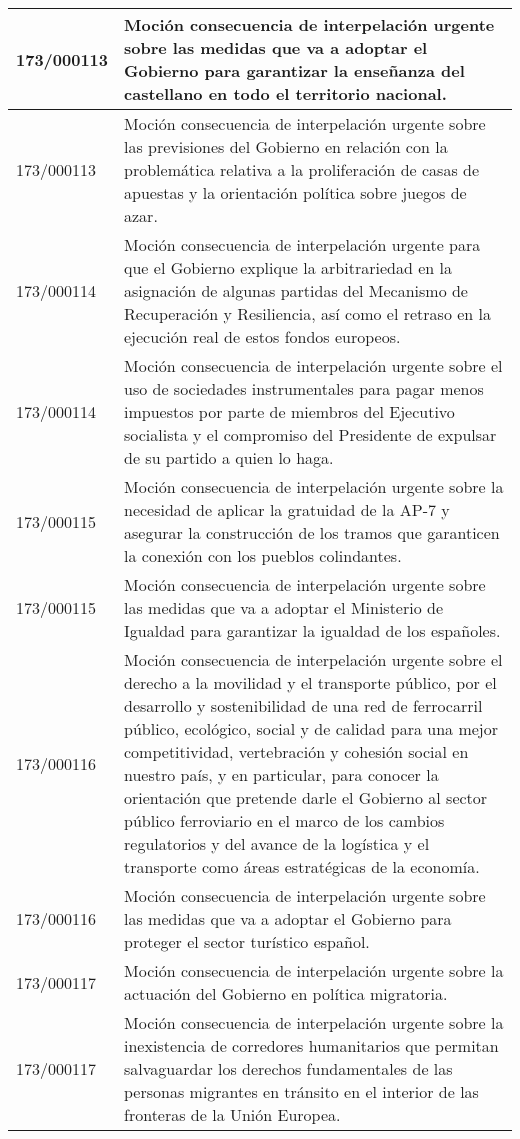 {\begin{table}[H]
\begin{center}
\begin{tabularx}{\linewidth}{| l | X |}
\hline
173/000113 & Moción consecuencia de interpelación urgente sobre las medidas que va a adoptar el Gobierno para garantizar la enseñanza del castellano en todo el territorio nacional. \\
\hline
173/000113 & Moción consecuencia de interpelación urgente sobre las previsiones del Gobierno en relación con la problemática relativa a la proliferación de casas de apuestas y la orientación política sobre juegos de azar. \\
\hline
173/000114 & Moción consecuencia de interpelación urgente para que el Gobierno explique la arbitrariedad en la asignación de algunas partidas del Mecanismo de Recuperación y Resiliencia, así como el retraso en la ejecución real de estos fondos europeos. \\
\hline
173/000114 & Moción consecuencia de interpelación urgente sobre el uso de sociedades instrumentales para pagar menos impuestos por parte de miembros del Ejecutivo socialista y el compromiso del Presidente de expulsar de su partido a quien lo haga. \\
\hline
173/000115 & Moción consecuencia de interpelación urgente sobre la necesidad de aplicar la gratuidad de la AP-7 y asegurar la construcción de los tramos que garanticen la conexión con los pueblos colindantes. \\
\hline
173/000115 & Moción consecuencia de interpelación urgente sobre las medidas que va a adoptar el Ministerio de Igualdad para garantizar la igualdad de los españoles. \\
\hline
173/000116 & Moción consecuencia de interpelación urgente sobre el derecho a la movilidad y el transporte público, por el desarrollo y sostenibilidad de una red de ferrocarril público, ecológico, social y de calidad para una mejor competitividad, vertebración y cohesión social en nuestro país, y en particular, para conocer la orientación que pretende darle el Gobierno al sector público ferroviario en el marco de los cambios regulatorios y del avance de la logística y el transporte como áreas estratégicas de la economía. \\
\hline
173/000116 & Moción consecuencia de interpelación urgente sobre las medidas que va a adoptar el Gobierno para proteger el sector turístico español. \\
\hline
173/000117 & Moción consecuencia de interpelación urgente sobre la actuación del Gobierno en política migratoria. \\
\hline
173/000117 & Moción consecuencia de interpelación urgente sobre la inexistencia de corredores humanitarios que permitan salvaguardar los derechos fundamentales de las personas migrantes en tránsito en el interior de las fronteras de la Unión Europea. \\

\end{tabularx}
\end{center}
\end{table}}
